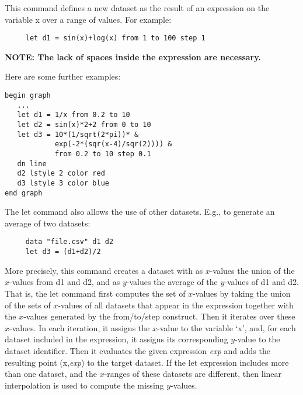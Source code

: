 \begin{commanddescription}
\item[{\sf let ds = {\it exp {\sf [from} low{\sf] [to} high{\sf] [step} exp{\sf] [where} exp{\sf]}}}]
This command defines a new dataset as the result of an expression on the variable x over a range of values. For example:

\begin{Verbatim}
     let d1 = sin(x)+log(x) from 1 to 100 step 1
\end{Verbatim}

{\bf NOTE: The lack of spaces inside the expression are necessary.}

Here are some further examples:

\begin{minipage}[c]{8cm}
\begin{Verbatim}
begin graph
   ...
   let d1 = 1/x from 0.2 to 10
   let d2 = sin(x)*2+2 from 0 to 10
   let d3 = 10*(1/sqrt(2*pi))* &
            exp(-2*(sqr(x-4)/sqr(2)))) &
            from 0.2 to 10 step 0.1
   dn line
   d2 lstyle 2 color red
   d3 lstyle 3 color blue
end graph
\end{Verbatim}
\end{minipage}
\hfill
\begin{minipage}[c]{7cm}
\mbox{}
\end{minipage}
\vspace{0.2cm}

The let command also allows the use of other datasets. E.g., to generate an average of two datasets:

\begin{Verbatim}
     data "file.csv" d1 d2
     let d3 = (d1+d2)/2
\end{Verbatim}

More precisely, this command creates a dataset with as $x$-values the union of the $x$-values from d1 and d2, and as $y$-values the average of the $y$-values of d1 and d2. That is, the let command first computes the set of $x$-values by taking the union of the sets of $x$-values of all datasets that appear in the expression together with the $x$-values generated by the from/to/step construct. Then it iterates over these $x$-values. In each iteration, it assigns the $x$-value to the variable `x', and, for each dataset included in the expression, it assigns its corresponding $y$-value to the dataset identifier. Then it evaluates the given expression {\it exp} and adds the resulting point (x,{\it exp}) to the target dataset. If the let expression includes more than one dataset, and the $x$-ranges of these datasets are different, then linear interpolation is used to compute the missing $y$-values.


\end{commanddescription}

